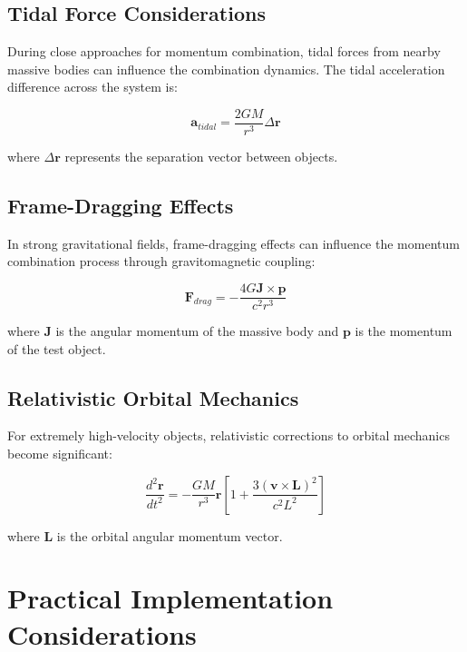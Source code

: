 \documentclass[11pt,a4paper]{article}
\theoremstyle{remark}
\begin{document}
\subsection{Tidal Force Considerations}

During close approaches for momentum combination, tidal forces from nearby massive bodies can influence the combination dynamics. The tidal acceleration difference across the system is:

\begin{equation}
\mathbf{a}_{tidal} = \frac{2GM}{r^3} \Delta \mathbf{r}
\label{eq:tidal_acceleration}
\end{equation}

where $\Delta \mathbf{r}$ represents the separation vector between objects.

\subsection{Frame-Dragging Effects}

In strong gravitational fields, frame-dragging effects can influence the momentum combination process through gravitomagnetic coupling:

\begin{equation}
\mathbf{F}_{drag} = -\frac{4G\mathbf{J} \times \mathbf{p}}{c^2 r^3}
\label{eq:frame_dragging}
\end{equation}

where $\mathbf{J}$ is the angular momentum of the massive body and $\mathbf{p}$ is the momentum of the test object.

\subsection{Relativistic Orbital Mechanics}

For extremely high-velocity objects, relativistic corrections to orbital mechanics become significant:

\begin{equation}
\frac{d^2\mathbf{r}}{dt^2} = -\frac{GM}{r^3}\mathbf{r}\left[1 + \frac{3(\mathbf{v} \times \mathbf{L})^2}{c^2 L^2}\right]
\label{eq:relativistic_orbit}
\end{equation}

where $\mathbf{L}$ is the orbital angular momentum vector.

\section{Practical Implementation Considerations}
\end{document}
